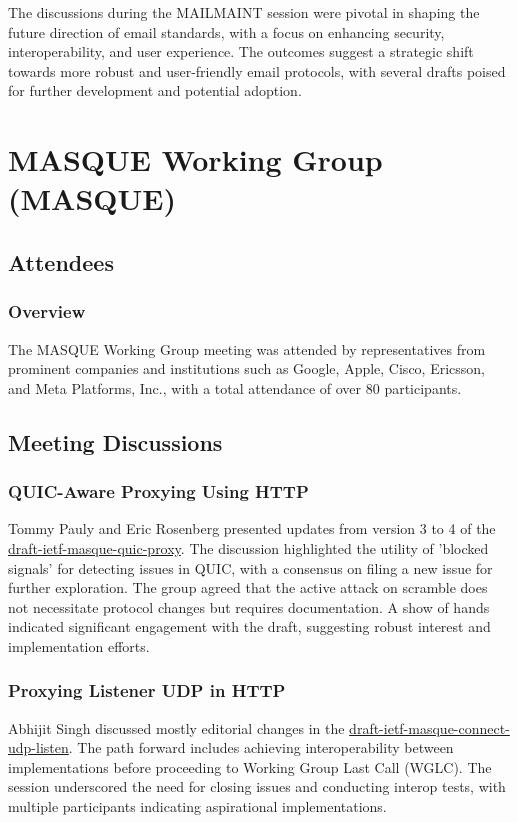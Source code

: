 \documentclass{article}
\begin{document}
The discussions during the MAILMAINT session were pivotal in shaping the future direction of email standards, with a focus on enhancing security, interoperability, and user experience. The outcomes suggest a strategic shift towards more robust and user-friendly email protocols, with several drafts poised for further development and potential adoption.



\newpage

\section{MASQUE Working Group (MASQUE)}

\subsection{Attendees}
\subsubsection{Overview}
The MASQUE Working Group meeting was attended by representatives from prominent companies and institutions such as Google, Apple, Cisco, Ericsson, and Meta Platforms, Inc., with a total attendance of over 80 participants.

\subsection{Meeting Discussions}

\subsubsection{QUIC-Aware Proxying Using HTTP}
Tommy Pauly and Eric Rosenberg presented updates from version 3 to 4 of the \href{https://datatracker.ietf.org/doc/draft-ietf-masque-quic-proxy/}{draft-ietf-masque-quic-proxy}. The discussion highlighted the utility of 'blocked signals' for detecting issues in QUIC, with a consensus on filing a new issue for further exploration. The group agreed that the active attack on scramble does not necessitate protocol changes but requires documentation. A show of hands indicated significant engagement with the draft, suggesting robust interest and implementation efforts.

\subsubsection{Proxying Listener UDP in HTTP}
Abhijit Singh discussed mostly editorial changes in the \href{https://datatracker.ietf.org/doc/draft-ietf-masque-connect-udp-listen/}{draft-ietf-masque-connect-udp-listen}. The path forward includes achieving interoperability between implementations before proceeding to Working Group Last Call (WGLC). The session underscored the need for closing issues and conducting interop tests, with multiple participants indicating aspirational implementations.
\end{document}
